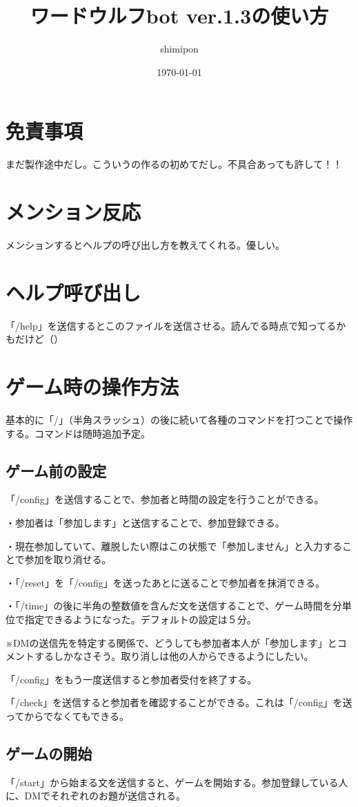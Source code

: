 \documentclass{jsarticle}
\title{ワードウルフbot ver.1.3の使い方}
\author{shimipon}
\date{\today}
\begin{document}
\maketitle
\section{免責事項}
まだ製作途中だし。こういうの作るの初めてだし。不具合あっても許して！！
\section{メンション反応}
メンションするとヘルプの呼び出し方を教えてくれる。優しい。
\section{ヘルプ呼び出し}
「/help」を送信するとこのファイルを送信させる。読んでる時点で知ってるかもだけど（）
\section{ゲーム時の操作方法}
基本的に「/」（半角スラッシュ）の後に続いて各種のコマンドを打つことで操作する。コマンドは随時追加予定。
\subsection{ゲーム前の設定}
「/config」を送信することで、参加者と時間の設定を行うことができる。

・参加者は「参加します」と送信することで、参加登録できる。

・現在参加していて、離脱したい際はこの状態で「参加しません」と入力することで参加を取り消せる。

・「/reset」を「/config」を送ったあとに送ることで参加者を抹消できる。

・「/time」の後に半角の整数値を含んだ文を送信することで、ゲーム時間を分単位で指定できるようになった。デフォルトの設定は５分。

※DMの送信先を特定する関係で、どうしても参加者本人が「参加します」とコメントするしかなさそう。取り消しは他の人からできるようにしたい。

「/config」をもう一度送信すると参加者受付を終了する。

「/check」を送信すると参加者を確認することができる。これは「/config」を送ってからでなくてもできる。
\subsection{ゲームの開始}
「/start」から始まる文を送信すると、ゲームを開始する。参加登録している人に、DMでそれぞれのお題が送信される。
\end{document}
